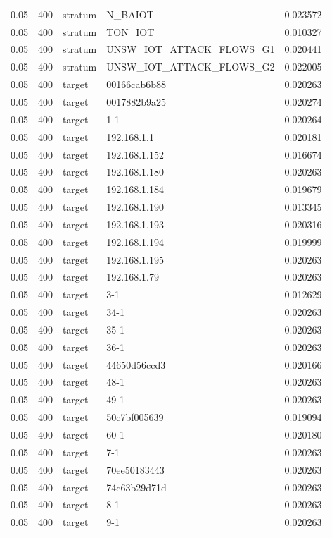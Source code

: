 \begin{tabular}{lllll}
0.05 & 400 & stratum & N\_BAIOT & 0.023572 \\
0.05 & 400 & stratum & TON\_IOT & 0.010327 \\
0.05 & 400 & stratum & UNSW\_IOT\_ATTACK\_FLOWS\_G1 & 0.020441 \\
0.05 & 400 & stratum & UNSW\_IOT\_ATTACK\_FLOWS\_G2 & 0.022005 \\
0.05 & 400 & target & 00166cab6b88 & 0.020263 \\
0.05 & 400 & target & 0017882b9a25 & 0.020274 \\
0.05 & 400 & target & 1-1 & 0.020264 \\
0.05 & 400 & target & 192.168.1.1 & 0.020181 \\
0.05 & 400 & target & 192.168.1.152 & 0.016674 \\
0.05 & 400 & target & 192.168.1.180 & 0.020263 \\
0.05 & 400 & target & 192.168.1.184 & 0.019679 \\
0.05 & 400 & target & 192.168.1.190 & 0.013345 \\
0.05 & 400 & target & 192.168.1.193 & 0.020316 \\
0.05 & 400 & target & 192.168.1.194 & 0.019999 \\
0.05 & 400 & target & 192.168.1.195 & 0.020263 \\
0.05 & 400 & target & 192.168.1.79 & 0.020263 \\
0.05 & 400 & target & 3-1 & 0.012629 \\
0.05 & 400 & target & 34-1 & 0.020263 \\
0.05 & 400 & target & 35-1 & 0.020263 \\
0.05 & 400 & target & 36-1 & 0.020263 \\
0.05 & 400 & target & 44650d56ccd3 & 0.020166 \\
0.05 & 400 & target & 48-1 & 0.020263 \\
0.05 & 400 & target & 49-1 & 0.020263 \\
0.05 & 400 & target & 50c7bf005639 & 0.019094 \\
0.05 & 400 & target & 60-1 & 0.020180 \\
0.05 & 400 & target & 7-1 & 0.020263 \\
0.05 & 400 & target & 70ee50183443 & 0.020263 \\
0.05 & 400 & target & 74c63b29d71d & 0.020263 \\
0.05 & 400 & target & 8-1 & 0.020263 \\
0.05 & 400 & target & 9-1 & 0.020263 \\

\end{tabular}

